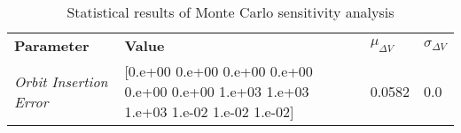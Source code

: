 
                    \begin{table}[]
                    \centering
                    \begin{tabular}{l l l l}
                    \rowcolor[HTML]{EFEFEF} \textbf{Parameter} & \textbf{Value} & \textbf{$\mu_{\Delta V}$} & \textbf{$\sigma_{\Delta V}$} \\
                    \textit{Orbit Insertion Error} & [0.e+00 0.e+00 0.e+00 0.e+00 0.e+00 0.e+00 1.e+03 1.e+03 1.e+03 1.e-02
 1.e-02 1.e-02] & 0.0582 & 0.0 \\

                    \end{tabular}
                    \caption{Statistical results of Monte Carlo sensitivity analysis}
                    \label{tab:SensitivityAnalysis}
                    \end{table}
                    